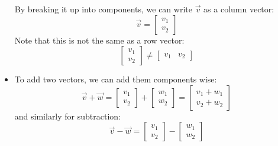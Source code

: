 \begin{itemize}
\begin{center}
    \end{center}
    By breaking it up into components, we can write $\vec{v}$ as a column vector:
    \begin{equation}
        \vec{v} = \begin{bmatrix}
            v_1 \\ v_2
        \end{bmatrix}
        \label{eq:}
    \end{equation}
    Note that this is not the same as a row vector:
    \begin{equation}
        \begin{bmatrix}
            v_1 \\ v_2
        \end{bmatrix}
        \neq 
        \begin{bmatrix}
            v_1 & v_2
        \end{bmatrix}
        \label{eq:}
    \end{equation}
    \item To add two vectors, we can add them components wise:
    \begin{equation}
        \vec{v}+\vec{w}=\begin{bmatrix}
            v_1 \\ v_2
        \end{bmatrix}+\begin{bmatrix}
            w_1 \\ w_2
        \end{bmatrix}=\begin{bmatrix}
            v_1+w_1 \\ v_2+w_2
        \end{bmatrix}
        \label{eq:}
    \end{equation}
    and similarly for subtraction:
    \begin{equation}
        \vec{v}-\vec{w}=\begin{bmatrix}
            v_1 \\ v_2
        \end{bmatrix}-\begin{bmatrix}
            w_1 \\ w_2

\end{bmatrix}
\end{equation}
\end{itemize}
